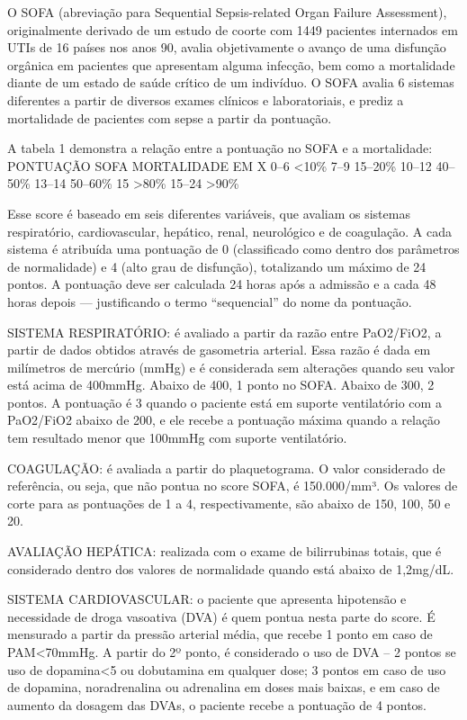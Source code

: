 \documentclass[12pt]{article}
\begin{document}
O SOFA (abreviação para Sequential Sepsis-related Organ Failure Assessment), originalmente derivado de um estudo de coorte com 1449 pacientes internados em UTIs de 16 países nos anos 90, avalia objetivamente o avanço de uma disfunção orgânica em pacientes que apresentam alguma infecção, bem como a mortalidade diante de um estado de saúde crítico de um indivíduo.
O SOFA avalia 6 sistemas diferentes a partir de diversos exames clínicos e laboratoriais, e prediz a mortalidade de pacientes com sepse a partir da pontuação.

A tabela 1 demonstra a relação entre a pontuação no SOFA e a mortalidade:
PONTUAÇÃO SOFA	MORTALIDADE EM X%
0–6	<10\%
7–9	15–20\%
10–12	40–50\%
13–14	50–60\%
15	>80\%
15–24	>90\%

Esse score é baseado em seis diferentes variáveis, que avaliam os sistemas respiratório, cardiovascular, hepático, renal, neurológico e de coagulação. A cada sistema é atribuída uma pontuação de 0 (classificado como dentro dos parâmetros de normalidade) e 4 (alto grau de disfunção), totalizando um máximo de 24 pontos. A pontuação deve ser calculada 24 horas após a admissão e a cada 48 horas depois — justificando o termo “sequencial” do nome da pontuação.


SISTEMA RESPIRATÓRIO: é avaliado a partir da razão entre PaO2/FiO2, a partir de dados obtidos através de gasometria arterial. Essa razão é dada em milímetros de mercúrio (mmHg) e é considerada sem alterações quando seu valor está acima de 400mmHg. Abaixo de 400, 1 ponto no SOFA. Abaixo de 300, 2 pontos. A pontuação é 3 quando o paciente está em suporte ventilatório com a PaO2/FiO2 abaixo de 200, e ele recebe a pontuação máxima quando a relação tem resultado menor que 100mmHg com suporte ventilatório.

COAGULAÇÃO: é avaliada a partir do plaquetograma. O valor considerado de referência, ou seja, que não pontua no score SOFA, é 150.000/mm³. Os valores de corte para as pontuações de 1 a 4, respectivamente, são abaixo de 150, 100, 50 e 20. 

AVALIAÇÃO HEPÁTICA: realizada com o exame de bilirrubinas totais, que é considerado dentro dos valores de normalidade quando está abaixo de 1,2mg/dL.

SISTEMA CARDIOVASCULAR: o paciente que apresenta hipotensão e necessidade de droga vasoativa (DVA) é quem pontua nesta parte do score. É mensurado a partir da pressão arterial média, que recebe 1 ponto em caso de PAM<70mmHg. A partir do 2º ponto, é considerado o uso de DVA – 2 pontos se uso de dopamina<5 ou dobutamina em qualquer dose;  3 pontos em caso de uso de dopamina, noradrenalina ou adrenalina em doses mais baixas, e em caso de aumento da dosagem das DVAs, o paciente recebe a pontuação de 4 pontos.
\end{document}

